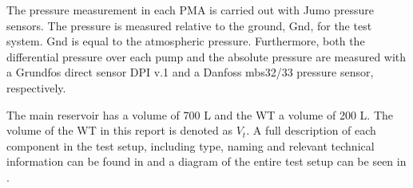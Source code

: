 The pressure measurement in each PMA is carried out with Jumo pressure sensors. The pressure is measured relative to the ground, Gnd, for the test system. Gnd is equal to the atmospheric pressure. Furthermore, both the differential pressure over each pump and the absolute pressure are measured with a Grundfos direct sensor DPI v.1 and a Danfoss mbs32/33 pressure sensor, respectively.    

The main reservoir has a volume of 700 L and the WT a volume of 200 L. The volume of the WT in this report is denoted as $V_t$. A full description of each component in the test setup, including type, naming and relevant technical information can be found in  and a diagram of the entire test setup can be seen in .
